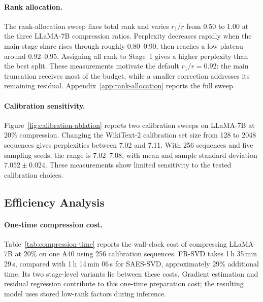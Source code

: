 \documentclass[11pt]{article}
\begin{document}
\paragraph{Rank allocation.}
The rank-allocation sweep fixes total rank and varies $r_1/r$ from 0.50 to 1.00 at the three LLaMA-7B compression ratios. Perplexity decreases rapidly when the main-stage share rises through roughly 0.80--0.90, then reaches a low plateau around 0.92--0.95. Assigning all rank to Stage~1 gives a higher perplexity than the best split. These measurements motivate the default $r_1/r=0.92$: the main truncation receives most of the budget, while a smaller correction addresses its remaining residual. Appendix~\ref{app:rank-allocation} reports the full sweep.

\paragraph{Calibration sensitivity.}


Figure~\ref{fig:calibration-ablation} reports two calibration sweeps on LLaMA-7B at 20\% compression. Changing the WikiText-2 calibration set size from 128 to 2048 sequences gives perplexities between 7.02 and 7.11. With 256 sequences and five sampling seeds, the range is 7.02--7.08, with mean and sample standard deviation $7.052\pm0.024$. These measurements show limited sensitivity to the tested calibration choices.

\subsection{Efficiency Analysis}\label{sec:efficiency}

\paragraph{One-time compression cost.}
Table~\ref{tab:compression-time} reports the wall-clock cost of compressing LLaMA-7B at 20\% on one A40 using 256 calibration sequences. FR-SVD takes 1\,h 35\,min 29\,s, compared with 1\,h 14\,min 06\,s for SAES-SVD, approximately 29\% additional time. Its two stage-level variants lie between these costs. Gradient estimation and residual regression contribute to this one-time preparation cost; the resulting model uses stored low-rank factors during inference.


\end{document}
